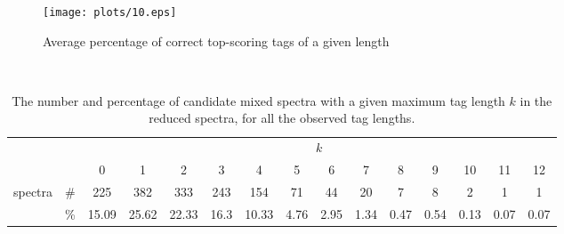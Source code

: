 \documentclass{article}
\begin{document}
\begin{figure}
  \begin{center}
\texttt{[image: plots/10.eps]}

\end{center}
\caption{Average percentage of correct top-scoring tags  of a given length}
  \label{fig:LABEL}
\end{figure}

\begin{landscape}

\begin{table}[h]
\vspace{3mm}\
{\centering
\begin{center}
\begin{tabular}{|c|c|
c|c|c|c|c|c|c|c|c|c|c|c|c|}
  \hline
  \multicolumn{2}{|c|}{} & \multicolumn{ 13}{|c|}{$k$} \\
  \cline{3-15}
  \multicolumn{2}{|c|}{} 
 & 0 & 1 & 2 & 3 & 4 & 5 & 6 & 7 & 8 & 9 & 10 & 11 & 12\\
  \hline
  \multirow{2}{*}{spectra} & \#
 & 225 & 382 & 333 & 243 & 154 & 71 & 44 & 20 & 7 & 8 & 2 & 1 & 1\\
   & \%
 & 15.09 & 25.62 & 22.33 & 16.3 & 10.33 & 4.76 & 2.95 & 1.34 & 0.47 & 0.54 & 0.13 & 0.07 & 0.07\\
  \hline
\end{tabular}
\end{center}
\par}
\centering
\caption{The number and percentage of candidate mixed spectra with a given maximum tag length $k$ in the reduced spectra, for all the observed tag lengths.}
\vspace{3mm}
\label{table:mixed-tags}
\end{table}
\end{landscape}
\end{document}
